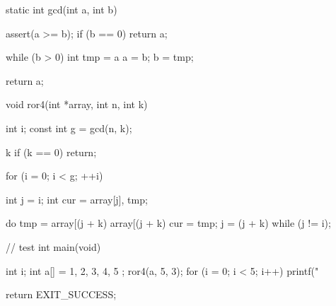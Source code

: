 \begin{Codex}[label=ror.c]
static int gcd(int a, int b) {
    assert(a >= b);
    if (b == 0) {
        return a;
    }

    while (b > 0) {
        int tmp = a %
        a = b;
        b = tmp;
    }

    return a;
}

void ror4(int *array, int n, int k) {
    int i;
    const int g = gcd(n, k);

    k %
    if (k == 0)
        return;

    for (i = 0; i < g; ++i) {
        int j = i;
        int cur = array[j], tmp;

        do {
            tmp = array[(j + k) %
            array[(j + k) %
            cur = tmp;
            j = (j + k) %
        } while (j != i);
    }
}

// test
int main(void) {
    int i;
    int a[] = { 1, 2, 3, 4, 5 };
    ror4(a, 5, 3);
    for (i = 0; i < 5; i++) {
        printf("%
    }

    return EXIT_SUCCESS;
}
\end{Codex}

